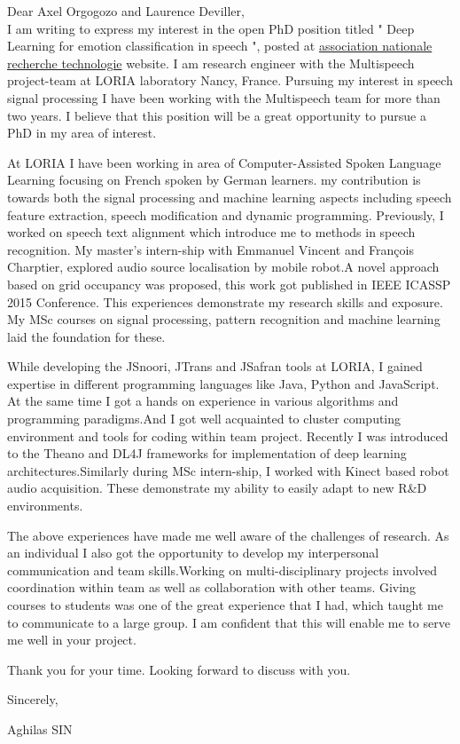 \documentclass[10pt,a4paper]{letter}
\begin{document}
Dear Axel Orgogozo and Laurence Deviller,\\

		I am writing to express my interest in the open PhD position titled " Deep Learning for emotion classification in speech ", posted at \href{http://www.anrt.asso.fr/com/imgAdmin/1459332134891.pdf}{association nationale recherche technologie} website. I am research engineer with the Multispeech project-team at LORIA laboratory Nancy, France. Pursuing my interest in speech signal processing I have been working with the Multispeech team for more than two years. I believe that this position will be a great opportunity to pursue a PhD in my area of interest. 
		
		At LORIA I have been working in area of Computer-Assisted Spoken Language Learning focusing on French spoken by German learners. my contribution is towards both the signal processing and machine learning aspects including speech feature extraction, speech modification and dynamic programming. Previously, I worked on speech text alignment which introduce me to methods in speech recognition. My master's intern-ship with Emmanuel Vincent and François Charptier, explored audio source localisation by mobile robot.A novel approach based on grid occupancy was proposed, this work got published in IEEE ICASSP 2015 Conference.  This experiences demonstrate my research skills and exposure. My MSc courses on signal processing, pattern recognition and machine learning laid the foundation for these.   

		
		While developing the JSnoori, JTrans and JSafran tools at LORIA, I gained expertise in different programming languages like Java, Python and JavaScript. At the same time I got a hands on experience in various algorithms and programming paradigms.And I got well acquainted 	to cluster computing environment	and tools for coding within team project. Recently I was introduced to the Theano and DL4J frameworks for implementation of deep learning architectures.Similarly during MSc intern-ship, I worked with Kinect based robot audio acquisition. These demonstrate my ability to easily adapt to new R\&D environments.    
		
		The above experiences have made me well aware of the challenges of research. As an individual I also got the opportunity to develop my interpersonal communication and team 		
skills.Working on multi-disciplinary projects involved coordination within  team as well as collaboration with other teams. Giving courses to students was one of the great experience that I had, which taught me to communicate to a large group. I am confident that this will enable me to serve me well in your project.

	Thank you for your time. Looking forward to discuss with you.
	
Sincerely,

Aghilas SIN 
	
		
\end{document}
